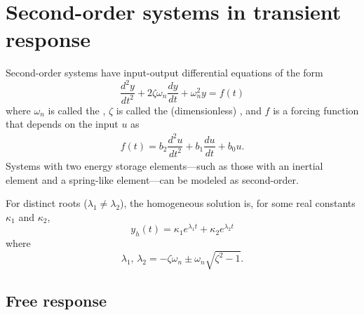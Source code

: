 \documentclass[dynamic_systems.tex]{subfiles}
\begin{document}
\section[Second-order systems]{Second-order systems in transient response}
\tags{}

Second-order systems have input-output differential equations of the form
\begin{equation}\label{eq:ioode_second_order}
	\dfrac{d^2 y}{dt^2} + 2 \zeta \omega_n \dfrac{dy}{dt} + \omega_n^2 y = f(t)
\end{equation}
where $\omega_n$ is called the , $\zeta$ is called the (dimensionless) , and $f$ is a forcing function that depends on the input $u$ as
\begin{align}
	f(t) = b_2\dfrac{d^2 u}{d t^2} + b_1\dfrac{d u}{d t} + b_0 u.
\end{align}
Systems with two energy storage elements---such as those with an inertial element and a spring-like element---can be modeled as second-order.
\tags{}

For distinct roots ($\lambda_1\ne\lambda_2$), the homogeneous solution is, for some real constants $\kappa_1$ and $\kappa_2$,
\begin{equation} \label{eq:homo2}
	y_h(t) = \kappa_1 e^{\lambda_1 t} + \kappa_2 e^{\lambda_2 t}
\end{equation}
where
\begin{equation} \label{eq:lambda2}
	\lambda_1 \text{, } \lambda_2 = -\zeta \omega_n \pm \omega_n \sqrt{\zeta^2 - 1}.
\end{equation}

\subsection{Free response}
\tags{}
\label{lec:second_order_free_response}
\end{document}
